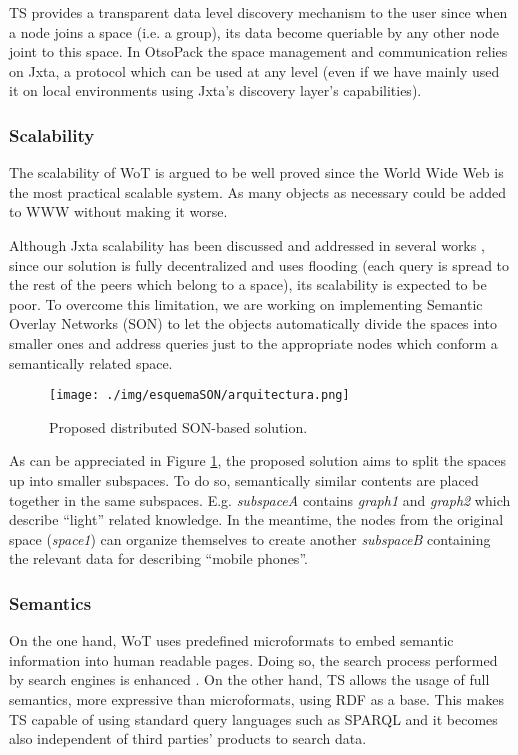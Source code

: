 TS provides a transparent data level discovery mechanism to the user since when a node joins a space (i.e. a group), its data become queriable by any other
node joint to this space. In OtsoPack the space management and communication relies on Jxta, a protocol which can be used at any level (even if we
have mainly used it on local environments using Jxta's discovery layer's capabilities).

\subsubsection{Scalability}
The scalability of WoT is argued to be well proved since the World Wide Web is the most practical scalable system. As many objects as
necessary could be added to WWW without making it worse. 

Although Jxta scalability has been discussed and addressed in several works \cite{antoniu_performance_2007}, since our solution is fully decentralized
and uses flooding (each query is spread to the rest of the peers which belong to a space), its scalability is expected to be poor. To overcome this limitation,
we are working on implementing Semantic Overlay Networks (SON) to let the objects automatically divide the spaces into smaller ones and address queries
just to the appropriate nodes which conform a semantically related space.

\begin{figure} [htbp]
	\centering
		\texttt{[image: ./img/esquemaSON/arquitectura.png]}
	\caption{Proposed distributed SON-based solution.}
	\label{fig:changeToSON}
\end{figure}

As can be appreciated in Figure \ref{fig:changeToSON}, the proposed solution aims to split the spaces up into smaller subspaces.
To do so, semantically similar contents are placed together in the same subspaces. E.g. \textit{subspaceA} contains \textit{graph1}
and \textit{graph2} which describe ``light'' related knowledge. In the meantime, the nodes from the original space (\textit{space1}) can organize
themselves to create another \textit{subspaceB} containing the relevant data for describing ``mobile phones''.

\subsubsection{Semantics}
On the one hand, WoT uses predefined microformats to embed semantic information into human readable pages. Doing so, the search process performed
by search engines is enhanced \cite{guinard_internet_2011}. On the other hand, TS allows the usage of full semantics, more expressive than microformats,
using RDF as a base. This makes TS capable of using standard query languages such as SPARQL and it becomes also independent of third parties' products to search data.




